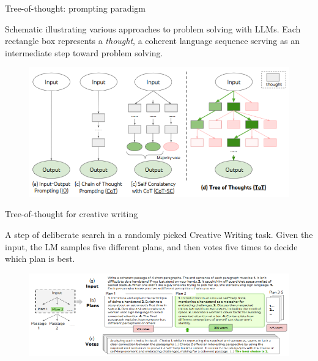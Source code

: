 
\begin{vbframe}{Tree-of-thought: prompting paradigm}

\vfill

Schematic illustrating various approaches to problem solving with LLMs. Each rectangle box represents a \textit{thought}, a coherent language sequence serving as an intermediate step toward problem solving.

\begin{figure}
    \centering
    \includegraphics{figure/tot_vs_cot.png}\\
\end{figure}

\vfill

\end{vbframe}



\begin{vbframe}{Tree-of-thought for creative writing}

\vfill

A step of deliberate search in a randomly picked Creative Writing task. Given the input, the LM samples five different plans, and then votes five times to decide which plan is best.
    
\begin{figure}
    \centering
    \includegraphics{figure/tot_creative_writing.png}\\
\end{figure}

\vfill

\end{vbframe}

